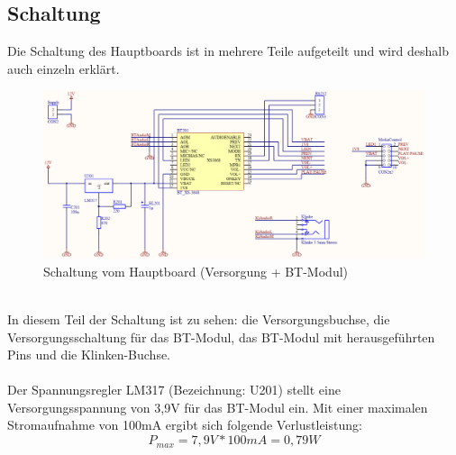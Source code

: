 \subsection{Schaltung}
Die Schaltung des Hauptboards ist in mehrere Teile aufgeteilt und wird deshalb auch einzeln erklärt.
\begin{figure} [h]
	\centering
	\caption{Schaltung vom Hauptboard (Versorgung + BT-Modul)}
	\includegraphics[width=1\textwidth]{schaltungen/hauptboard_sch1.png}
\end{figure} \\
In diesem Teil der Schaltung ist zu sehen: die Versorgungsbuchse, die Versorgungsschaltung für das BT-Modul, das BT-Modul mit herausgeführten Pins und die Klinken-Buchse.\\ \\
Der Spannungsregler LM317 (Bezeichnung: U201) stellt eine Versorgungsspannung von 3,9V für das BT-Modul ein. Mit einer maximalen Stromaufnahme von 100mA ergibt sich folgende Verlustleistung:
\begin{equation}
	P_{max} = 7,9V * 100mA = 0,79W
\end{equation}





